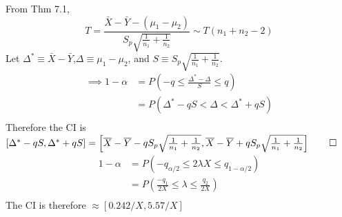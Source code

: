 \documentclass[twocolumn]{article}
\begin{document}
From Thm 7.1, \[
T=\frac{\bar X-\bar Y-(\mu_1-\mu_2)}{S_p\sqrt{\frac{1}{n_1}+\frac{1}{n_2}}}\sim T(n_1+n_2-2)\]
Let $\Delta^*\equiv\bar X-\bar Y$,$\Delta\equiv\mu_1-\mu_2$, and $S\equiv{S_p\sqrt{\frac{1}{n_1}+\frac{1}{n_2}}}$.
\begin{align*}
\implies 1-\alpha&=
P\left(-q\le \frac{\Delta^*-\Delta}{S} \le q\right)\\
&=P\left(\Delta^*-qS<\Delta<\Delta^*+qS\right)\\
\end{align*}
Therefore the CI is $[\Delta^*-qS,\Delta^*+qS]=\left[\bar X-\bar Y-qS_p\sqrt{\frac{1}{n_1}+\frac{1}{n_2}},\bar X-\bar Y+qS_p\sqrt{\frac{1}{n_1}+\frac{1}{n_2}}\right]\qed$
\begin{align*}
1-\alpha&=P(-q_{\alpha/2}\le2\lambda X\le q_{1-\alpha/2})\\
&=P\left(\frac{-q_1}{2X}\le \lambda \le \frac{q_2}{2X}\right)\\
\end{align*}
The CI is therefore $\approx[0.242/X,5.57/X]$
\end{document}
